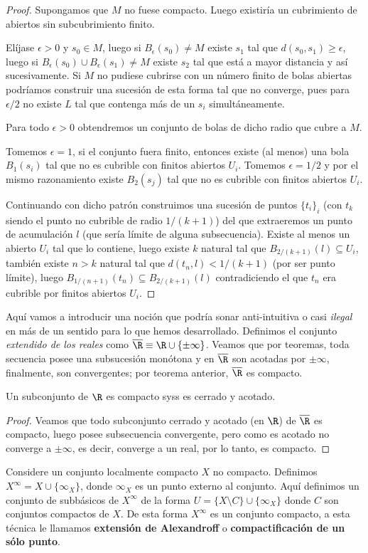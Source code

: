 \documentclass[11pt,oneside,a4paper]{book}
\begin{document}
\begin{proof}
Supongamos que $M$ no fuese compacto. Luego existiría un cubrimiento de abiertos sin subcubrimiento finito.

Elíjase $\epsilon\gt 0$ y $s_0\in M$, luego si $B_\epsilon(s_0)\neq M$ existe $s_1$ tal que $d(s_0,s_1)\geq\epsilon$, luego si $B_\epsilon(s_0)\cup B_\epsilon(s_1)\neq M$ existe $s_2$ tal que está a mayor distancia y así sucesivamente. Si $M$ no pudiese cubrirse con un número finito de bolas abiertas podríamos construir una sucesión de esta forma tal que no converge, pues para $\epsilon/2$ no existe $L$ tal que contenga más de un $s_i$ simultáneamente.

Para todo $\epsilon\gt 0$ obtendremos un conjunto de bolas de dicho radio que cubre a $M$.

Tomemos $\epsilon=1$, si el conjunto fuera finito, entonces existe (al menos) una bola $B_1(s_i)$ tal que no es cubrible con finitos abiertos $U_i$. Tomemos $\epsilon=1/2$ y por el mismo razonamiento existe $B_2(s_j)$ tal que no es cubrible con finitos abiertos $U_i$.

Continuando con dicho patrón construimos una sucesión de puntos $\{t_i\}_i$ (con $t_k$ siendo el punto no cubrible de radio $1/(k+1)$) del que extraeremos un punto de acumulación $l$ (que sería límite de alguna subsecuencia). Existe al menos un abierto $U_i$ tal que lo contiene, luego existe $k$ natural tal que $B_{2/(k+1)}(l)\subseteq U_i$, también existe $n\gt k$ natural tal que $d(t_n,l)\lt 1/(k+1)$ (por ser punto límite), luego $B_{1/(n+1)}(t_n)\subseteq B_{2/(k+1)}(l)$ contradiciendo el que $t_n$ era cubrible por finitos abiertos $U_i$.
\end{proof}
Aquí vamos a introducir una noción que podría sonar anti-intuitiva o casi \textit{ilegal} en más de un sentido para lo que hemos desarrollado. Definimos el conjunto \textit{extendido de los reales} como $\overline{\R}\equiv\R\cup\{\pm\infty\}$. Veamos que por teoremas, toda secuencia posee una subsucesión monótona y en $\overline{\R}$ son acotadas por $\pm\infty$, finalmente, son convergentes; por teorema anterior, $\overline{\R}$ es compacto.
\begin{thm}
Un subconjunto de $\R$ es compacto syss es cerrado y acotado.
\end{thm}
\begin{proof}
Veamos que todo subconjunto cerrado y acotado (en $\R$) de $\overline{\R}$ es compacto, luego posee subsecuencia convergente, pero como es acotado no converge a $\pm\infty$, es decir, converge a un real, por lo tanto, es compacto.
\end{proof}
Considere un conjunto localmente compacto $X$ no compacto. Definimos $X^\infty=X\cup\{\infty_X\}$, donde $\infty_X$ es un punto externo al conjunto. Aquí definimos un conjunto de subbásicos de $X^\infty$ de la forma $U=\{X\setminus C\}\cup\{\infty_X\}$ donde $C$ son conjuntos compactos de $X$. De esta forma $X^\infty$ es un conjunto compacto, a esta técnica le llamamos \textbf{extensión de Alexandroff} o \textbf{compactificación de un sólo punto}.
\end{document}
